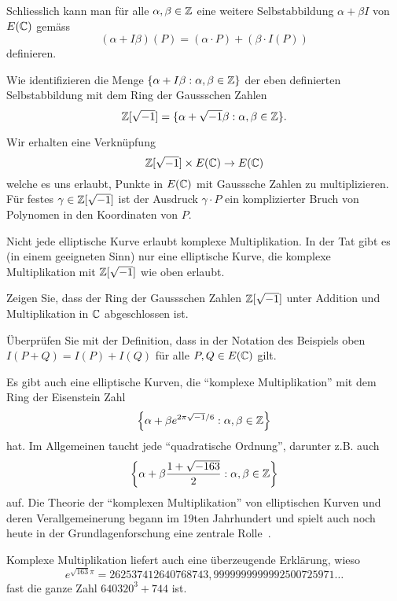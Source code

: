 \begin{beispiel}
  Schliesslich kann man  für alle $\alpha,\beta\in{\mathbb{Z}}$ eine
  weitere Selbstabbildung $\alpha + \beta I$ von $E({\mathbb{C}})$ gemäss
  \begin{equation*}
    (\alpha + I \beta)(P) = (\alpha \cdot P) + (\beta \cdot I(P))
  \end{equation*}
  definieren. 

  Wie identifizieren die Menge $\{\alpha + I\beta :
  \alpha,\beta\in{\mathbb{Z}}\}$ der eben definierten Selbstabbildung mit dem
  Ring der
  Gaussschen Zahlen
  \begin{equation*}
    {\mathbb{Z}}[\sqrt{-1}] = \{\alpha + \sqrt{-1}\beta : \alpha,\beta\in{\mathbb{Z}}\}.
  \end{equation*}

  Wir erhalten eine Verknüpfung
  \begin{equation*}
    {\mathbb{Z}}[\sqrt{-1}]\times E({\mathbb{C}})\rightarrow E({\mathbb{C}})
  \end{equation*}
  welche es uns erlaubt, Punkte in $E({\mathbb{C}})$ mit Gausssche Zahlen zu
  multiplizieren. Für festes $\gamma\in{\mathbb{Z}}[\sqrt{-1}]$ ist der
  Ausdruck $\gamma\cdot P$ ein komplizierter Bruch von Polynomen in
  den Koordinaten von $P$.

  Nicht jede elliptische Kurve erlaubt komplexe Multiplikation. In der
  Tat gibt es (in einem geeigneten Sinn) nur eine elliptische Kurve,
  die komplexe Multiplikation mit ${\mathbb{Z}}[\sqrt{-1}]$ wie oben erlaubt.
\end{beispiel}

\begin{aufgabe}
  Zeigen Sie, dass der Ring der Gaussschen Zahlen ${\mathbb{Z}}[\sqrt{-1}]$
  unter Addition und Multiplikation in  ${\mathbb{C}}$ abgeschlossen ist. 
\end{aufgabe}

\begin{aufgabe}
  Überprüfen Sie mit der Definition, dass in der Notation des
  Beispiels oben $I(P+Q) = I(P)+I(Q)$ für alle $P,Q\in E({\mathbb{C}})$ gilt.
\end{aufgabe}

Es gibt auch eine elliptische Kurven, die ``komplexe Multiplikation'' mit
dem Ring der Eisenstein Zahl
\begin{equation*}
  \left\{\alpha +\beta e^{2\pi\sqrt{-1}/6} : \alpha,\beta\in{\mathbb{Z}}\right\}
\end{equation*}
hat. Im Allgemeinen taucht jede ``quadratische Ordnung'', darunter
z.B. auch
\begin{equation*}
  \left\{\alpha +\beta \frac{1+\sqrt{-163}}{2} : \alpha,\beta\in{\mathbb{Z}}\right\}
\end{equation*}
auf. 
Die Theorie der ``komplexen Multiplikation'' von elliptischen Kurven und deren
Verallgemeinerung begann im 19ten Jahrhundert und spielt auch noch
heute in der Grundlagenforschung eine zentrale Rolle~\cite{quanta:ao}.

Komplexe Multiplikation liefert auch eine überzeugende Erklärung,
wieso  
\begin{equation*}
  e^{\sqrt{163}\pi} = 262537412640768743,9999999999992500725971\ldots
\end{equation*}
fast die ganze Zahl  $640320^3 + 744$ ist.

